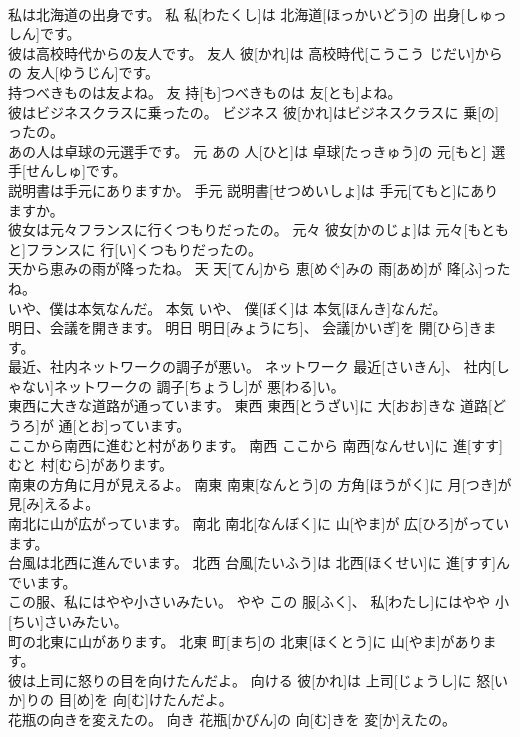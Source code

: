 \documentclass[8pt]{extreport}
\begin{document}
\begin{CJK}{UTF8}{min}
\\	私は北海道の出身です。	私	私[わたくし]は 北海道[ほっかいどう]の 出身[しゅっしん]です。	
\\	彼は高校時代からの友人です。	友人	彼[かれ]は 高校時代[こうこう じだい]からの 友人[ゆうじん]です。	
\\	持つべきものは友よね。	友	持[も]つべきものは 友[とも]よね。	
\\	彼はビジネスクラスに乗ったの。	ビジネス	彼[かれ]はビジネスクラスに 乗[の]ったの。	
\\	あの人は卓球の元選手です。	元	あの 人[ひと]は 卓球[たっきゅう]の 元[もと] 選手[せんしゅ]です。	
\\	説明書は手元にありますか。	手元	説明書[せつめいしょ]は 手元[てもと]にありますか。	
\\	彼女は元々フランスに行くつもりだったの。	元々	彼女[かのじょ]は 元々[もともと]フランスに 行[い]くつもりだったの。	
\\	天から恵みの雨が降ったね。	天	天[てん]から 恵[めぐ]みの 雨[あめ]が 降[ふ]ったね。	
\\	いや、僕は本気なんだ。	本気	いや、 僕[ぼく]は 本気[ほんき]なんだ。	
\\	明日、会議を開きます。	明日	明日[みょうにち]、 会議[かいぎ]を 開[ひら]きます。	
\\	最近、社内ネットワークの調子が悪い。	ネットワーク	最近[さいきん]、 社内[しゃない]ネットワークの 調子[ちょうし]が 悪[わる]い。	
\\	東西に大きな道路が通っています。	東西	東西[とうざい]に 大[おお]きな 道路[どうろ]が 通[とお]っています。	
\\	ここから南西に進むと村があります。	南西	ここから 南西[なんせい]に 進[すす]むと 村[むら]があります。	
\\	南東の方角に月が見えるよ。	南東	南東[なんとう]の 方角[ほうがく]に 月[つき]が 見[み]えるよ。	
\\	南北に山が広がっています。	南北	南北[なんぼく]に 山[やま]が 広[ひろ]がっています。	
\\	台風は北西に進んでいます。	北西	台風[たいふう]は 北西[ほくせい]に 進[すす]んでいます。	
\\	この服、私にはやや小さいみたい。	やや	この 服[ふく]、 私[わたし]にはやや 小[ちい]さいみたい。	
\\	町の北東に山があります。	北東	町[まち]の 北東[ほくとう]に 山[やま]があります。	
\\	彼は上司に怒りの目を向けたんだよ。	向ける	彼[かれ]は 上司[じょうし]に 怒[いか]りの 目[め]を 向[む]けたんだよ。	
\\	花瓶の向きを変えたの。	向き	花瓶[かびん]の 向[む]きを 変[か]えたの。	

\end{CJK}
\end{document}
